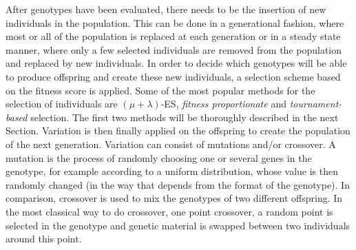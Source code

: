 
    After genotypes have been evaluated, there needs to be the insertion of new individuals in the population. This can be done in a generational fashion, where most or all of the population is replaced at each generation or in a steady state manner, where only a few selected individuals are removed from the population and replaced by new individuals. In order to decide which genotypes will be able to produce offspring and create these new individuals, a selection scheme based on the fitness score is applied. Some of the most popular methods for the selection of individuals are \((\mu + \lambda)\)-ES, \emph{fitness proportionate} and \emph{tournament-based} selection. The first two methods will be thoroughly described in the next Section. Variation is then finally applied on the offspring to create the population of the next generation. Variation can consist of mutations and/or crossover. A mutation is the process of randomly choosing one or several genes in the genotype, for example according to a uniform distribution, whose value is then randomly changed (in the way that depends from the format of the genotype). In comparison, crossover is used to mix the genotypes of two different offspring. In the most classical way to do crossover, one point crossover, a random point is selected in the genotype and genetic material is swapped between two individuals around this point. 


